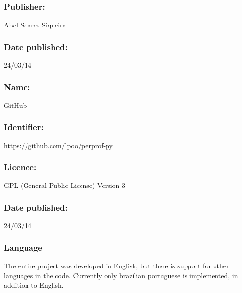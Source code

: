     \subsubsection*{Publisher:} Abel Soares Siqueira

    \subsubsection*{Date published:} 24/03/14

\CodeRepository

    \subsubsection*{Name:} GitHub

    \subsubsection*{Identifier:} \url{https://github.com/lpoo/perprof-py}

    \subsubsection*{Licence:} GPL (General Public License) Version 3

    \subsubsection*{Date published:} 24/03/14

\subsubsection*{Language}

    The entire project was developed in English, but there is support for
    other languages in the code. Currently only brazilian portuguese is
    implemented, in addition to English.

